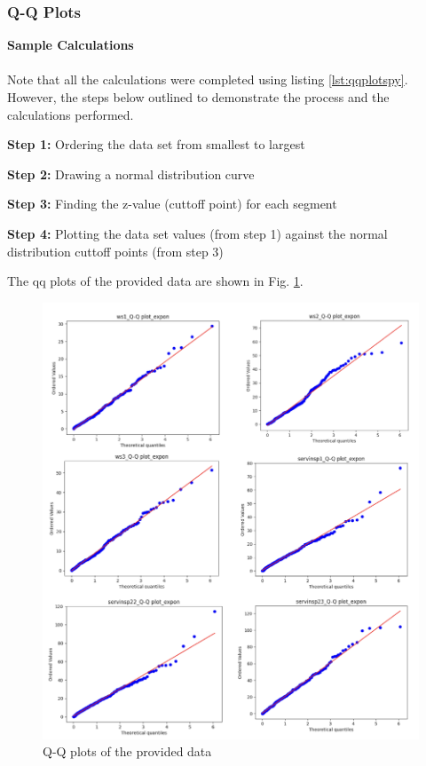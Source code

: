 \documentclass[final, hidelinks, 12pt, a4paper]{article}
\begin{document}
    \subsubsection{Q-Q Plots}
    \label{sssct:qqPLOTS}
    {\bfseries Sample Calculations}\\\\
    Note that all the calculations were completed using listing \ref{lst:qqplotspy}.
    However, the steps below outlined to demonstrate the process and the calculations performed.
    \begin{description}
        \item {\bfseries Step 1:} Ordering the data set from smallest to largest
        \item {\bfseries Step 2:} Drawing a normal distribution curve
        \item {\bfseries Step 3:} Finding the z-value (cuttoff point) for each segment
        \item {\bfseries Step 4:} Plotting the data set values (from step 1) against the normal distribution cuttoff points (from step 3)
    \end{description}
    \clearpage
    \noindent The \gls{qq} plots of the provided data are shown in Fig. \ref{fig:qqPlotData}.
    \begin{figure}[htbp]
        \centering
        \includegraphics[width=0.85\linewidth]{qqPlots.png}
        \caption{Q-Q plots of the provided data}
        \label{fig:qqPlotData}
    \end{figure}
    \clearpage
\end{document}
